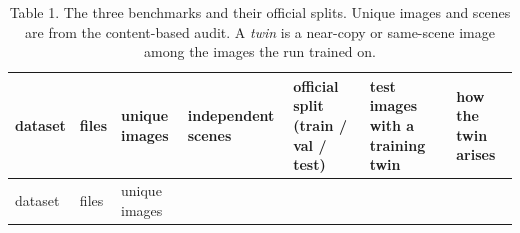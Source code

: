 \documentclass[
  10pt,
]{article}
\begin{document}
\begin{longtable}[]{@{}
  >{\raggedright\arraybackslash}p{}
  >{\raggedright\arraybackslash}p{}
  >{\raggedright\arraybackslash}p{}
  >{\raggedright\arraybackslash}p{}
  >{\raggedright\arraybackslash}p{}
  >{\raggedright\arraybackslash}p{}
  >{\raggedright\arraybackslash}p{}@{}}
\caption{Table 1. The three benchmarks and their official splits. Unique
images and scenes are from the content-based audit. A \emph{twin} is a
near-copy or same-scene image among the images the run trained
on.}\tabularnewline
\toprule\noalign{}
\begin{minipage}[b]{\linewidth}\raggedright
dataset
\end{minipage} & \begin{minipage}[b]{\linewidth}\raggedright
files
\end{minipage} & \begin{minipage}[b]{\linewidth}\raggedright
unique images
\end{minipage} & \begin{minipage}[b]{\linewidth}\raggedright
independent scenes
\end{minipage} & \begin{minipage}[b]{\linewidth}\raggedright
official split (train / val / test)
\end{minipage} & \begin{minipage}[b]{\linewidth}\raggedright
test images with a training twin
\end{minipage} & \begin{minipage}[b]{\linewidth}\raggedright
how the twin arises
\end{minipage} \\
\midrule\noalign{}
\endfirsthead
\toprule\noalign{}
\begin{minipage}[b]{\linewidth}\raggedright
dataset
\end{minipage} & \begin{minipage}[b]{\linewidth}\raggedright
files
\end{minipage} & \begin{minipage}[b]{\linewidth}\raggedright
unique images
\end{minipage} & \begin{minipage}[b]{\linewidth}\raggedright

\end{minipage}
\end{longtable}
\end{document}

